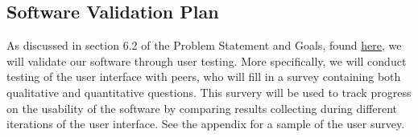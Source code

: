 \documentclass[12pt, titlepage]{article}
\begin{document}



\subsection{Software Validation Plan}
  As discussed in section 6.2 of the Problem Statement and Goals, found \href{https://github.com/OKKM-insights/OKKM.insights/blob/main/docs/ProblemStatementAndGoals/ProblemStatement.pdf}{here}, 
  we will validate our software through user testing. More specifically, we will conduct testing of the user interface with peers, who will fill in a survey containing both qualitative and quantitative questions.
  This survery will be used to track progress on the usability of the software by comparing results collecting during different iterations of the user interface. See the appendix for a sample of the user survey.




\end{document}
